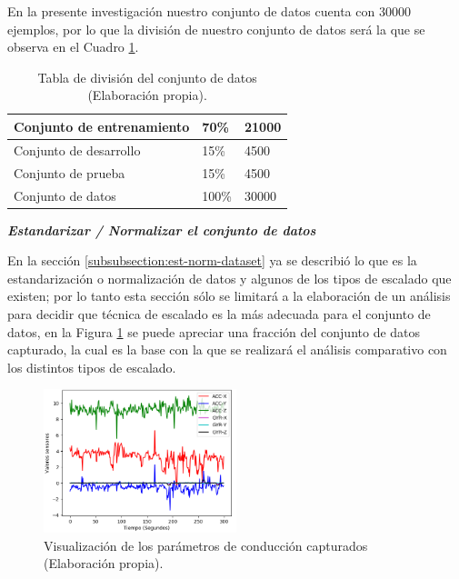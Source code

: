 En la presente investigaci\'{o}n nuestro conjunto de datos cuenta con 30000 ejemplos, por lo que la divisi\'{o}n de nuestro conjunto de datos ser\'{a} la que se observa en el Cuadro \ref{table:division-dataset}.


\begin{table}[]
\centering
\begin{tabular}{|l|l|l|}
\hline
Conjunto de entrenamiento & 70\%  & 21000 \\ \hline
Conjunto de desarrollo    & 15\%  & 4500  \\ \hline
Conjunto de prueba        & 15\%  & 4500  \\ \hline
Conjunto de datos         & 100\% & 30000 \\ \hline
\end{tabular}
\caption{Tabla de divisi\'{o}n del conjunto de datos (Elaboraci\'{o}n propia).}
\label{table:division-dataset}
\end{table}

\vspace{5mm} %

\textbf{\textit{Estandarizar / Normalizar el conjunto de datos}}

\vspace{5mm} %

En la secci\'{o}n \ref{subsubsection:est-norm-dataset} ya se describi\'{o} lo que es la estandarizaci\'{o}n o normalizaci\'{o}n de datos y algunos de los tipos de escalado que existen; por lo tanto esta secci\'{o}n s\'{o}lo se limitar\'{a} a la elaboraci\'{o}n de un an\'{a}lisis para decidir que t\'{e}cnica de escalado es la m\'{a}s adecuada para el conjunto de datos, en la Figura \ref{fig:datos_puros} se puede apreciar una fracci\'{o}n del conjunto de datos capturado, la cual es la base con la que se realizar\'{a} el an\'{a}lisis comparativo con los distintos tipos de escalado.

\begin{figure}[h!]
  \begin{center}	\includegraphics[width=0.5\textwidth,frame]{imagenes/Cap3/datos_sin_preprocesamiento}
  \caption{Visualizaci\'{o}n de los par\'{a}metros de conducci\'{o}n capturados (Elaboraci\'{o}n propia).}
  \label{fig:datos_puros}
  \end{center}
\end{figure}

